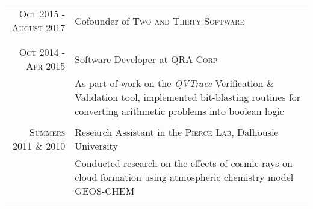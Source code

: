 \documentclass[a4paper,12pt]{article} %
\begin{document}
\begin{tabular}{r|p{11cm}}

\textsc{Oct 2015 - August 2017} & Cofounder of \textsc{Two and Thirty Software} \\
& \footnotesize{  } \\
\multicolumn{2}{c}{} \\

\textsc{Oct 2014 - Apr 2015} & Software Developer at \textsc{QRA Corp}\\
& \footnotesize{ As part of work on the \emph{QVTrace} Verification \& Validation tool, implemented bit-blasting routines for converting arithmetic problems into boolean logic } \\
\multicolumn{2}{c}{} \\

\textsc{Summers 2011 \& 2010} & Research Assistant in the \textsc{Pierce Lab}, Dalhousie University  \\
& \footnotesize{ Conducted research on the effects of cosmic rays on cloud formation using atmospheric chemistry model GEOS-CHEM } \\
\multicolumn{2}{c}{} \\




\end{tabular}
\end{document}
